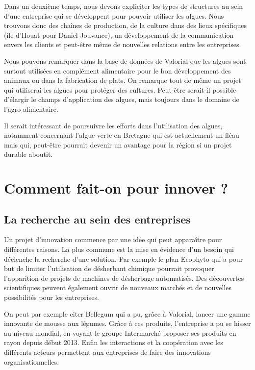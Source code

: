 \documentclass[a4paper,12pt]{report}
\begin{document}
			Dans un deuxième temps, nous devons expliciter les types de structures au sein d’une entreprise qui se développent pour pouvoir utiliser les algues. Nous trouvons donc des chaînes de production, de la culture dans des lieux spécifiques (île d’Houat pour Daniel Jouvance)\cite{Algues}, un développement de la communication envers les clients et peut-être même de nouvelles relations entre les entreprises.
			
			Nous pouvons remarquer dans la base de données de Valorial que les algues sont surtout utilisées en complément alimentaire pour le bon développement des animaux ou dans la fabrication de plats. On remarque tout de même un projet qui utiliserai les algues pour protéger des cultures. Peut-être serait-il possible d’élargir le champs d’application des algues, mais toujours dans le domaine de l’agro-alimentaire. 
			
			Il serait intéressant de poursuivre les efforts dans l’utilisation des algues, notamment concernant l’algue verte en Bretagne qui est actuellement un fléau mais qui, peut-être pourrait devenir un avantage pour la région si un projet durable aboutit. 
			
	\section{Comment fait-on pour innover ?}
			
		\subsection{La recherche au sein des entreprises}
			Un projet d’innovation commence par une idée qui peut apparaître pour différentes raisons. La plus commune est la mise en évidence d’un besoin qui déclenche la recherche d’une solution. Par exemple le plan Ecophyto\cite{RobotsChamps} qui a pour but de limiter l’utilisation de désherbant chimique pourrait provoquer l’apparition de projets de machines de désherbage automatisés. 
			Des découvertes scientifiques peuvent également ouvrir de nouveaux marchés et de nouvelles possibilités pour les entreprises. 
			
			On peut par exemple citer Bellegum\cite{Bellegum} qui a pu, grâce à Valorial, lancer une gamme innovante de mousse aux légumes. Grâce à ces produits, l’entreprise a pu se hisser au niveau mondial, en voyant le groupe Intermarché proposer ses produits en rayon depuis début 2013.
			Enfin les interactions et la coopération avec les différents acteurs permettent aux entreprises de faire des innovations organisationnelles.
			
\end{document}
